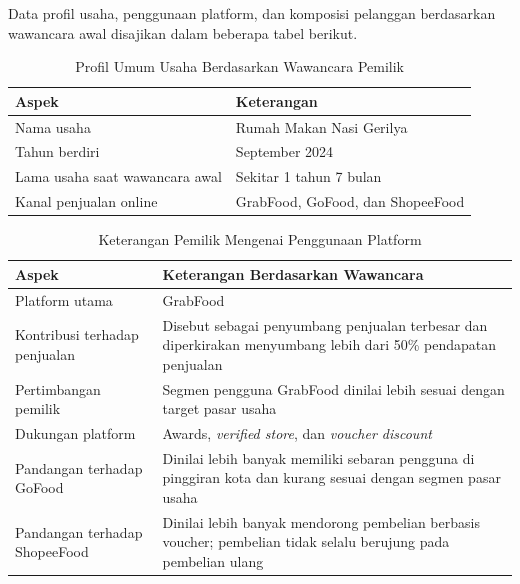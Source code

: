 \TableFloatBarrier

Data profil usaha, penggunaan platform, dan komposisi pelanggan berdasarkan wawancara awal disajikan dalam beberapa tabel berikut.

\begin{table}[!htbp]
    \centering
    \caption{Profil Umum Usaha Berdasarkan Wawancara Pemilik}
    \label{tab:profil_wawancara_awal}
    \begin{tabularx}{\textwidth}{|J|Y|}
        \toprule
        \textbf{Aspek}                 & \textbf{Keterangan}              \\ \hline
        \midrule
        Nama usaha                     & Rumah Makan Nasi Gerilya         \\ \hline
        Tahun berdiri                  & September 2024                   \\ \hline
        Lama usaha saat wawancara awal & Sekitar 1 tahun 7 bulan          \\ \hline
        Kanal penjualan online         & GrabFood, GoFood, dan ShopeeFood \\ \hline
        \bottomrule
    \end{tabularx}
\end{table}

\begin{table}[!htbp]
    \centering
    \caption{Keterangan Pemilik Mengenai Penggunaan Platform}
    \label{tab:wawancara_platform}
    \begin{tabularx}{\textwidth}{|J|Y|}
        \toprule
        \textbf{Aspek}                & \textbf{Keterangan Berdasarkan Wawancara}                                                                       \\ \hline
        \midrule
        Platform utama                & GrabFood                                                                                                        \\ \hline
        Kontribusi terhadap penjualan & Disebut sebagai penyumbang penjualan terbesar dan diperkirakan menyumbang lebih dari 50\% pendapatan penjualan  \\ \hline
        Pertimbangan pemilik          & Segmen pengguna GrabFood dinilai lebih sesuai dengan target pasar usaha                                         \\ \hline
        Dukungan platform             & Awards, \textit{verified store}, dan \textit{voucher discount}                                                  \\ \hline
        Pandangan terhadap GoFood     & Dinilai lebih banyak memiliki sebaran pengguna di pinggiran kota dan kurang sesuai dengan segmen pasar usaha    \\ \hline
        Pandangan terhadap ShopeeFood & Dinilai lebih banyak mendorong pembelian berbasis voucher; pembelian tidak selalu berujung pada pembelian ulang \\ \hline
        \bottomrule
    \end{tabularx}
\end{table}

